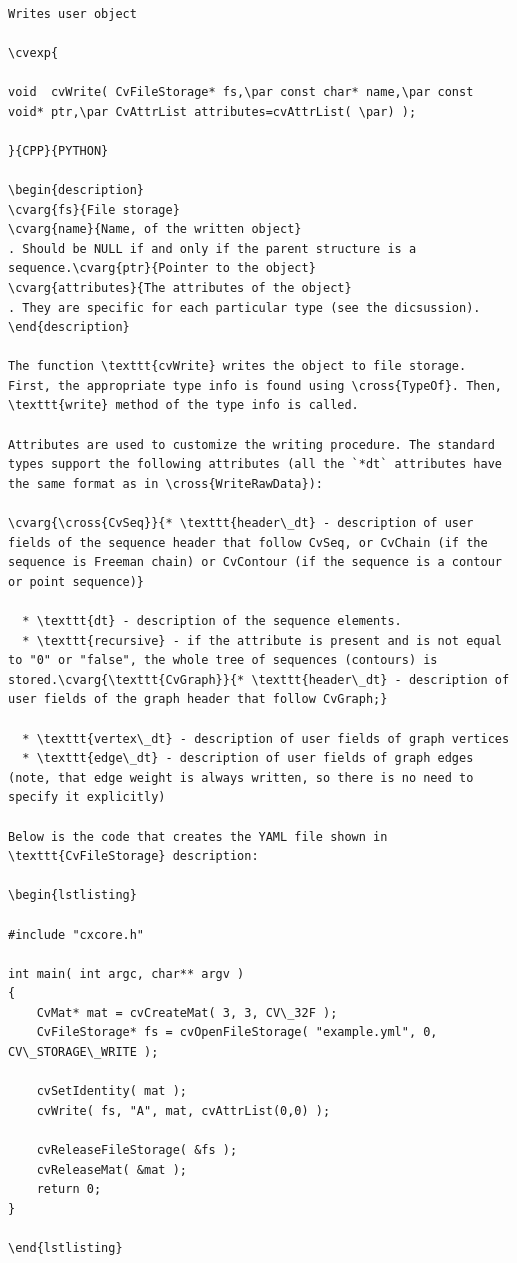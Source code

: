 \begin{verbatim}

Writes user object

\cvexp{

void  cvWrite( CvFileStorage* fs,\par const char* name,\par const void* ptr,\par CvAttrList attributes=cvAttrList( \par) );

}{CPP}{PYTHON}

\begin{description}
\cvarg{fs}{File storage}
\cvarg{name}{Name, of the written object}
. Should be NULL if and only if the parent structure is a sequence.\cvarg{ptr}{Pointer to the object}
\cvarg{attributes}{The attributes of the object}
. They are specific for each particular type (see the dicsussion).
\end{description}

The function \texttt{cvWrite} writes the object to file storage. First, the appropriate type info is found using \cross{TypeOf}. Then, \texttt{write} method of the type info is called.

Attributes are used to customize the writing procedure. The standard types support the following attributes (all the `*dt` attributes have the same format as in \cross{WriteRawData}):

\cvarg{\cross{CvSeq}}{* \texttt{header\_dt} - description of user fields of the sequence header that follow CvSeq, or CvChain (if the sequence is Freeman chain) or CvContour (if the sequence is a contour or point sequence)}

  * \texttt{dt} - description of the sequence elements.
  * \texttt{recursive} - if the attribute is present and is not equal to "0" or "false", the whole tree of sequences (contours) is stored.\cvarg{\texttt{CvGraph}}{* \texttt{header\_dt} - description of user fields of the graph header that follow CvGraph;}

  * \texttt{vertex\_dt} - description of user fields of graph vertices
  * \texttt{edge\_dt} - description of user fields of graph edges (note, that edge weight is always written, so there is no need to specify it explicitly)

Below is the code that creates the YAML file shown in \texttt{CvFileStorage} description:

\begin{lstlisting}

#include "cxcore.h"

int main( int argc, char** argv )
{
    CvMat* mat = cvCreateMat( 3, 3, CV\_32F );
    CvFileStorage* fs = cvOpenFileStorage( "example.yml", 0, CV\_STORAGE\_WRITE );

    cvSetIdentity( mat );
    cvWrite( fs, "A", mat, cvAttrList(0,0) );

    cvReleaseFileStorage( &fs );
    cvReleaseMat( &mat );
    return 0;
}

\end{lstlisting}


\end{verbatim}
